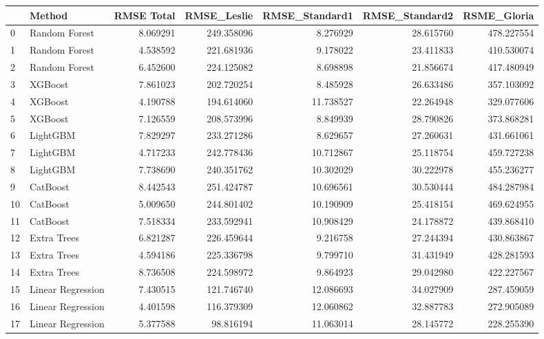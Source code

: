 \begin{tabular}{llrrrrr}
\toprule
{} &             Method &  RMSE Total &  RMSE\_Leslie &  RMSE\_Standard1 &  RMSE\_Standard2 &  RSME\_Gloria \\
\midrule
0  &      Random Forest &    8.069291 &   249.358096 &        8.276929 &       28.615760 &   478.227554 \\
1  &      Random Forest &    4.538592 &   221.681936 &        9.178022 &       23.411833 &   410.530074 \\
2  &      Random Forest &    6.452600 &   224.125082 &        8.698898 &       21.856674 &   417.480949 \\
3  &            XGBoost &    7.861023 &   202.720254 &        8.485928 &       26.633486 &   357.103092 \\
4  &            XGBoost &    4.190788 &   194.614060 &       11.738527 &       22.264948 &   329.077606 \\
5  &            XGBoost &    7.126559 &   208.573996 &        8.849939 &       28.790826 &   373.868281 \\
6  &           LightGBM &    7.829297 &   233.271286 &        8.629657 &       27.260631 &   431.661061 \\
7  &           LightGBM &    4.717233 &   242.778436 &       10.712867 &       25.118754 &   459.727238 \\
8  &           LightGBM &    7.738690 &   240.351762 &       10.302029 &       30.222978 &   455.236277 \\
9  &           CatBoost &    8.442543 &   251.424787 &       10.696561 &       30.530444 &   484.287984 \\
10 &           CatBoost &    5.009650 &   244.801402 &       10.190909 &       25.418154 &   469.624955 \\
11 &           CatBoost &    7.518334 &   233.592941 &       10.908429 &       24.178872 &   439.868410 \\
12 &        Extra Trees &    6.821287 &   226.459644 &        9.216758 &       27.244394 &   430.863867 \\
13 &        Extra Trees &    4.594186 &   225.336798 &        9.799710 &       31.431949 &   428.281593 \\
14 &        Extra Trees &    8.736508 &   224.598972 &        9.864923 &       29.042980 &   422.227567 \\
15 &  Linear Regression &    7.430515 &   121.746740 &       12.086693 &       34.027909 &   287.459059 \\
16 &  Linear Regression &    4.401598 &   116.379309 &       12.060862 &       32.887783 &   272.905089 \\
17 &  Linear Regression &    5.377588 &    98.816194 &       11.063014 &       28.145772 &   228.255390 \\
\bottomrule
\end{tabular}
